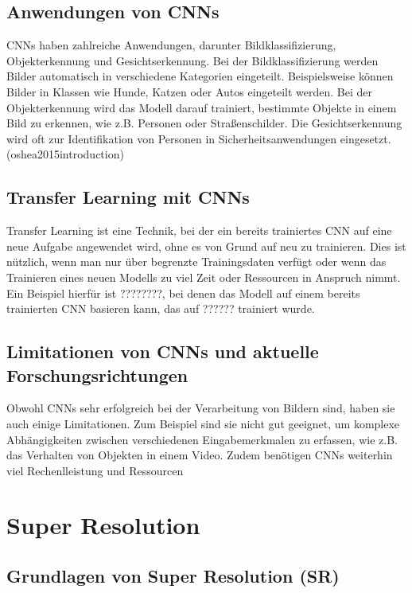     
    \subsection{Anwendungen von CNNs}
    
    CNNs haben zahlreiche Anwendungen, darunter Bildklassifizierung, Objekterkennung und Gesichtserkennung. 
Bei der Bildklassifizierung werden Bilder automatisch in verschiedene Kategorien eingeteilt. 
Beispielsweise können Bilder in Klassen wie Hunde, Katzen oder Autos eingeteilt werden. 
Bei der Objekterkennung wird das Modell darauf trainiert, bestimmte Objekte in einem Bild zu erkennen, wie z.B. Personen oder Straßenschilder. 
Die Gesichtserkennung wird oft zur Identifikation von Personen in Sicherheitsanwendungen eingesetzt.
    \footfullcite(oshea2015introduction)
    \subsection{Transfer Learning mit CNNs}
    
    Transfer Learning ist eine Technik, bei der ein bereits trainiertes CNN auf eine neue Aufgabe angewendet wird, ohne es von Grund auf neu zu trainieren. 
    Dies ist nützlich, wenn man nur über begrenzte Trainingsdaten verfügt oder wenn das Trainieren eines neuen Modells zu viel Zeit oder Ressourcen in Anspruch nimmt. 
    Ein Beispiel hierfür ist ????????, bei denen das Modell auf einem bereits trainierten CNN basieren kann, das auf ?????? trainiert wurde.
\subsection{Limitationen von CNNs und aktuelle Forschungsrichtungen}

    Obwohl CNNs sehr erfolgreich bei der Verarbeitung von Bildern sind, haben sie auch einige Limitationen. 
    Zum Beispiel sind sie nicht gut geeignet, um komplexe Abhängigkeiten zwischen verschiedenen Eingabemerkmalen zu erfassen, wie z.B. das Verhalten von Objekten in einem Video.
    Zudem benötigen CNNs weiterhin viel Rechenlleistung und Ressourcen

\section{Super Resolution}
    \subsection{Grundlagen von Super Resolution (SR)}
    
